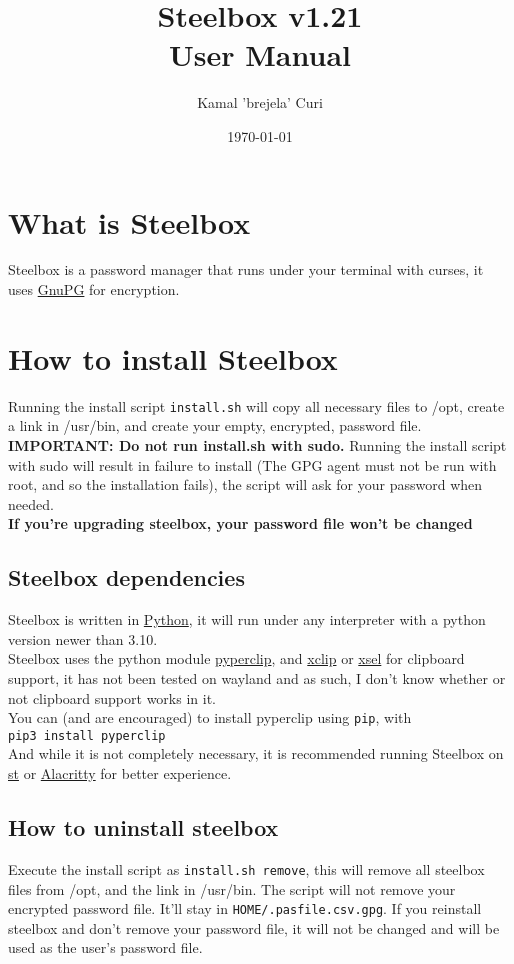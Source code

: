\documentclass{article}
\title{\textbf{Steelbox v1.21} \\ User Manual}
\date{\today}
\author{Kamal 'brejela' Curi}
\begin{document}
  \maketitle
  \tableofcontents
  \newpage

  \section{What is Steelbox}
  Steelbox is a password manager that runs under your terminal with curses, it
  uses \href{https://gnupg.org/}{GnuPG} for encryption.

  \section{How to install Steelbox}
  Running the install script \texttt{install.sh} will copy all necessary files to /opt, create a link in /usr/bin,
  and create your empty, encrypted, password file. \textbf{IMPORTANT: Do not run install.sh with sudo.}
  Running the install script with sudo will result in failure to install (The GPG agent must not be run with root, and so the installation fails),
  the script will ask for your password when needed.\\
  \textbf{If you're upgrading steelbox, your password file won't be changed}
  \subsection{Steelbox dependencies}
  Steelbox is written in \href{https://www.python.org/}{Python}, it will run under any interpreter with a python
  version newer than 3.10.
  \\
  Steelbox uses the python module \href{https://github.com/asweigart/pyperclip}{pyperclip}, and
   \href{https://github.com/astrand/xclip}{xclip} or \href{https://github.com/kfish/xsel}{xsel}
  for clipboard support, it has not been tested on wayland and as such, I don't know whether or not clipboard
  support works in it. \\
  You can (and are encouraged) to install pyperclip using \texttt{pip}, with \\
  \texttt{pip3 install pyperclip}\\
  And while it is not completely necessary, it is recommended running Steelbox
  on \href{https://st.suckless.org/}{st} or \href{https://alacritty.org/}{Alacritty} for better experience.
  \subsection{How to uninstall steelbox}
  Execute the install script as \texttt{install.sh remove}, this will remove all steelbox files from /opt, and the link in /usr/bin.
  The script will not remove your encrypted password file. It'll stay in \texttt{\textdollar HOME/.pasfile.csv.gpg}.
  If you reinstall steelbox and don't remove your password file, it will not be changed and will be used as the user's password file.
\end{document}
